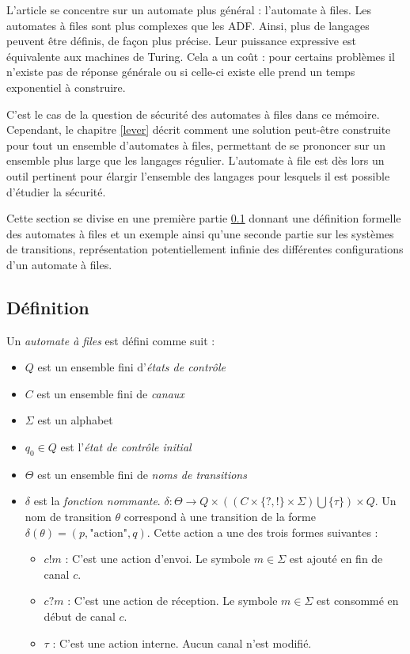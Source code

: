 L'article \cite{Vardhan04} se concentre sur un automate plus général : l'automate à files. Les automates à files sont plus complexes que les ADF. Ainsi, plus de langages peuvent être définis, de façon plus précise. Leur puissance expressive est équivalente aux machines de Turing. Cela a un coût : pour certains problèmes il n'existe pas de réponse générale ou si celle-ci existe elle prend un temps exponentiel à construire.

C'est le cas de la question de sécurité des automates à files dans ce mémoire. Cependant, le chapitre \ref{lever} décrit comment une solution peut-être construite pour tout un ensemble d'automates à files, permettant de se prononcer sur un ensemble plus large que les langages régulier. L'automate à file est dès lors un outil pertinent pour élargir l'ensemble des langages pour lesquels il est possible d'étudier la sécurité.

Cette section se divise en une première partie \ref{fifo:def} donnant une définition formelle des automates à files et un exemple ainsi qu'une seconde partie sur les systèmes de transitions, représentation potentiellement infinie des différentes configurations d'un automate à files.




\subsection{Définition}\label{fifo:def}
\begin{definition}
  Un \emph{automate à files} \fifo est défini comme suit :
  \begin{itemize}
    \item $Q$ est un ensemble fini d'\emph{états de contrôle}
    \item $C$ est un ensemble fini de \emph{canaux}
    \item $\Sigma$ est un alphabet
    \item $q_0 \in Q$ est l'\emph{état de contrôle initial}
    \item $\Theta$ est un ensemble fini de \emph{noms de transitions}
    \item $\delta$ est la \emph{fonction nommante}. $\delta : \Theta \rightarrow Q \times ((C \times \{?,!\} \times \Sigma) \bigcup \{\tau\}) \times Q$. Un nom de transition $\theta$ correspond à une transition de la forme $\delta(\theta)=(p,\text{"action"},q)$. Cette action a une des trois formes suivantes :
    \begin{itemize}
      \item $c!m$ : C'est une action d'envoi. Le symbole $m\in\Sigma$ est ajouté en fin de canal $c$.
      \item $c?m$ : C'est une action de réception. Le symbole $m\in\Sigma$ est consommé en début de canal $c$.
      \item $\tau$ : C'est une action interne. Aucun canal n'est modifié.
    \end{itemize}
  \end{itemize}
\end{definition}


